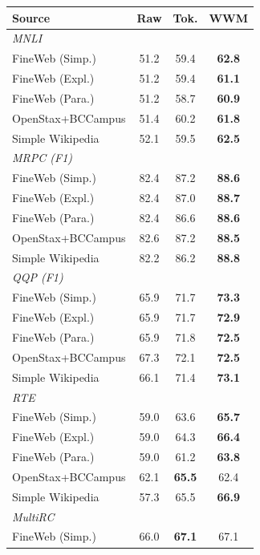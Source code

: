 \documentclass[11pt]{article}
\begin{document}
\begin{table}[t]
\centering
\footnotesize
\setlength{\tabcolsep}{2.5pt}
\begin{tabular}{lccc}
\toprule
\textbf{Source} & \textbf{Raw} & \textbf{Tok.} & \textbf{WWM} \\
\midrule
\multicolumn{4}{l}{\emph{MNLI}} \\
FineWeb (Simp.)    & 51.2 & 59.4 & \textbf{62.8} \\
FineWeb (Expl.)    & 51.2 & 59.4 & \textbf{61.1} \\
FineWeb (Para.)    & 51.2 & 58.7 & \textbf{60.9} \\
OpenStax+BCCampus  & 51.4 & 60.2 & \textbf{61.8} \\
Simple Wikipedia   & 52.1 & 59.5 & \textbf{62.5} \\
\midrule
\multicolumn{4}{l}{\emph{MRPC (F1)}} \\
FineWeb (Simp.)    & 82.4 & 87.2 & \textbf{88.6} \\
FineWeb (Expl.)    & 82.4 & 87.0 & \textbf{88.7} \\
FineWeb (Para.)    & 82.4 & 86.6 & \textbf{88.6} \\
OpenStax+BCCampus  & 82.6 & 87.2 & \textbf{88.5} \\
Simple Wikipedia   & 82.2 & 86.2 & \textbf{88.8} \\
\midrule
\multicolumn{4}{l}{\emph{QQP (F1)}} \\
FineWeb (Simp.)    & 65.9 & 71.7 & \textbf{73.3} \\
FineWeb (Expl.)    & 65.9 & 71.7 & \textbf{72.9} \\
FineWeb (Para.)    & 65.9 & 71.8 & \textbf{72.5} \\
OpenStax+BCCampus  & 67.3 & 72.1 & \textbf{72.5} \\
Simple Wikipedia   & 66.1 & 71.4 & \textbf{73.1} \\
\midrule
\multicolumn{4}{l}{\emph{RTE}} \\
FineWeb (Simp.)    & 59.0 & 63.6 & \textbf{65.7} \\
FineWeb (Expl.)    & 59.0 & 64.3 & \textbf{66.4} \\
FineWeb (Para.)    & 59.0 & 61.2 & \textbf{63.8} \\
OpenStax+BCCampus  & 62.1 & \textbf{65.5} & 62.4 \\
Simple Wikipedia   & 57.3 & 65.5 & \textbf{66.9} \\
\midrule
\multicolumn{4}{l}{\emph{MultiRC}} \\
FineWeb (Simp.)    & 66.0 & \textbf{67.1} & 67.1 \\

\end{tabular}
\end{table}
\end{document}
